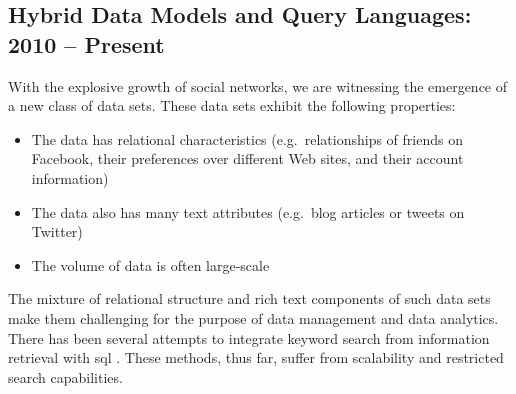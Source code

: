 	\subsection{Hybrid Data Models and Query Languages: 2010 -- Present}
		With the explosive growth of social networks, we are witnessing the emergence of a new class of data sets.  These data sets exhibit the following properties:
		
		\begin{itemize}
			\item The data has relational characteristics (e.g.~relationships of friends on Facebook, their preferences over different Web sites, and their account information)
			\item The data also has many text attributes (e.g.~blog articles or tweets on Twitter)
			\item The volume of data is often large-scale
		\end{itemize}
		
		The mixture of relational structure and rich text components of such data sets make them challenging for the purpose of data management and data analytics.  There has been several attempts to integrate keyword search from information retrieval with \gls{sql} \cite{banks-02, fuzzy-11, ir-03}.  These methods, thus far, suffer from scalability and restricted search capabilities.